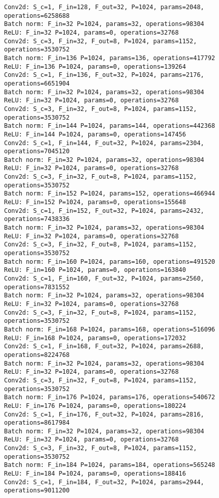 \begin{Verbatim}[fontsize=\small]
Conv2d: S_c=1, F_in=128, F_out=32, P=1024, params=2048, operations=6258688
Batch norm: F_in=32 P=1024, params=32, operations=98304
ReLU: F_in=32 P=1024, params=0, operations=32768
Conv2d: S_c=3, F_in=32, F_out=8, P=1024, params=1152, operations=3530752
Batch norm: F_in=136 P=1024, params=136, operations=417792
ReLU: F_in=136 P=1024, params=0, operations=139264
Conv2d: S_c=1, F_in=136, F_out=32, P=1024, params=2176, operations=6651904
Batch norm: F_in=32 P=1024, params=32, operations=98304
ReLU: F_in=32 P=1024, params=0, operations=32768
Conv2d: S_c=3, F_in=32, F_out=8, P=1024, params=1152, operations=3530752
Batch norm: F_in=144 P=1024, params=144, operations=442368
ReLU: F_in=144 P=1024, params=0, operations=147456
Conv2d: S_c=1, F_in=144, F_out=32, P=1024, params=2304, operations=7045120
Batch norm: F_in=32 P=1024, params=32, operations=98304
ReLU: F_in=32 P=1024, params=0, operations=32768
Conv2d: S_c=3, F_in=32, F_out=8, P=1024, params=1152, operations=3530752
Batch norm: F_in=152 P=1024, params=152, operations=466944
ReLU: F_in=152 P=1024, params=0, operations=155648
Conv2d: S_c=1, F_in=152, F_out=32, P=1024, params=2432, operations=7438336
Batch norm: F_in=32 P=1024, params=32, operations=98304
ReLU: F_in=32 P=1024, params=0, operations=32768
Conv2d: S_c=3, F_in=32, F_out=8, P=1024, params=1152, operations=3530752
Batch norm: F_in=160 P=1024, params=160, operations=491520
ReLU: F_in=160 P=1024, params=0, operations=163840
Conv2d: S_c=1, F_in=160, F_out=32, P=1024, params=2560, operations=7831552
Batch norm: F_in=32 P=1024, params=32, operations=98304
ReLU: F_in=32 P=1024, params=0, operations=32768
Conv2d: S_c=3, F_in=32, F_out=8, P=1024, params=1152, operations=3530752
Batch norm: F_in=168 P=1024, params=168, operations=516096
ReLU: F_in=168 P=1024, params=0, operations=172032
Conv2d: S_c=1, F_in=168, F_out=32, P=1024, params=2688, operations=8224768
Batch norm: F_in=32 P=1024, params=32, operations=98304
ReLU: F_in=32 P=1024, params=0, operations=32768
Conv2d: S_c=3, F_in=32, F_out=8, P=1024, params=1152, operations=3530752
Batch norm: F_in=176 P=1024, params=176, operations=540672
ReLU: F_in=176 P=1024, params=0, operations=180224
Conv2d: S_c=1, F_in=176, F_out=32, P=1024, params=2816, operations=8617984
Batch norm: F_in=32 P=1024, params=32, operations=98304
ReLU: F_in=32 P=1024, params=0, operations=32768
Conv2d: S_c=3, F_in=32, F_out=8, P=1024, params=1152, operations=3530752
Batch norm: F_in=184 P=1024, params=184, operations=565248
ReLU: F_in=184 P=1024, params=0, operations=188416
Conv2d: S_c=1, F_in=184, F_out=32, P=1024, params=2944, operations=9011200

\end{Verbatim}
